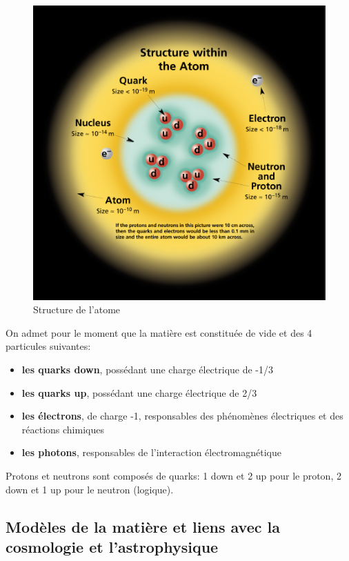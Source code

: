 \begin{figure}[ht]
    \centering
    \includegraphics[scale=0.45]{Images1/atome.png}
    \caption{Structure de l'atome}
    \label{fig:struct_atome}
\end{figure}
On admet pour le moment que la matière est constituée de vide et des 4 particules suivantes:

\begin{itemize}
    \item \textbf{les quarks down}, possédant une charge électrique de -1/3
    \item \textbf{les quarks up}, possédant une charge électrique de 2/3
    \item \textbf{les électrons}, de charge -1, responsables des phénomènes électriques et des réactions chimiques
    \item \textbf{les photons}, responsables de l'interaction électromagnétique 
\end{itemize}
Protons et neutrons sont composés de quarks: 1 down et 2 up pour le proton, 2 down et 1 up pour le neutron (logique). 

\subsection{Modèles de la matière et liens avec la cosmologie et l'astrophysique}

